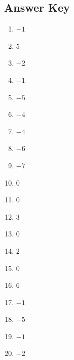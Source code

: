\documentclass{article}
\begin{document}
\newpage

\subsection*{Answer Key}

\begin{enumerate}
\item $\displaystyle -1 $ \ 
\item $\displaystyle 5 $ \ 
\item $\displaystyle -2 $ \ 
\item $\displaystyle -1 $ \ 
\item $\displaystyle -5 $ \ 
\item $\displaystyle -4 $ \ 
\item $\displaystyle -4 $ \ 
\item $\displaystyle -6 $ \ 
\item $\displaystyle -7 $ \ 
\item $\displaystyle 0 $ \ 
\item $\displaystyle 0 $ \ 
\item $\displaystyle 3 $ \ 
\item $\displaystyle 0 $ \ 
\item $\displaystyle 2 $ \ 
\item $\displaystyle 0 $ \ 
\item $\displaystyle 6 $ \ 
\item $\displaystyle -1 $ \ 
\item $\displaystyle -5 $ \ 
\item $\displaystyle -1 $ \ 
\item $\displaystyle -2 $ \ 

\end{enumerate}
\end{document}
